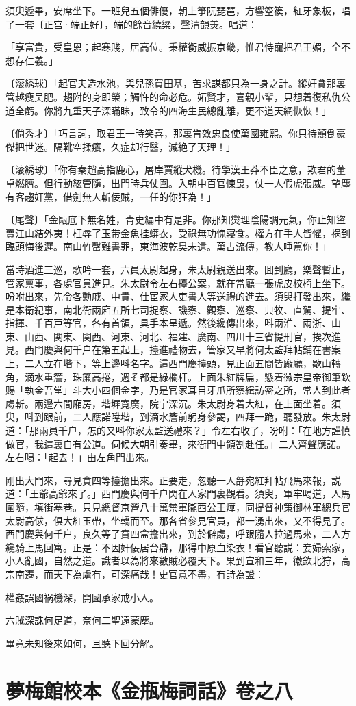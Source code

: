 須臾遞畢，安席坐下。一班兒五個俳優，朝上箏阮琵琶，方響箜篌，紅牙象板，唱了一套〔正宫·端正好〕，端的餘音繞梁，聲清韻羙。唱道：

\begin{myquote}
「享富貴，受皇恩；起寒賤，居高位。秉權衡威振京畿，惟君恃寵把君王媚，全不想存仁義。」

{\markfont〔滚綉球〕}「起官夫造水池，與兒孫買田基，苦求謀都只為一身之計。縱奸貪那裏管越瘦吴肥。趨附的身即榮；觸忤的命必危。妬賢才，喜親小輩，只想着復私仇公道全虧。你將九重天子深瞞眛，致令的四海生民總亂離，更不道天網恢恢！」

{\markfont〔倘秀才〕}「巧言詞，取君王一時笑喜，那裏肯效忠良使萬國雍熙。你只待顛倒豪傑把世迷。隔靴空揉癢，久症却行醫，滅絶了天理！」

{\markfont〔滚綉球〕}「你有秦趙高指鹿心，屠岸賈縱犬機。待學漢王莽不臣之意，欺君的董卓燃臍。但行動絃管隨，出門時兵仗圍。入朝中百官悚畏，仗一人假虎張威。望塵有客趨奸黨，借劍無人斬佞賊，一任的你狂為！」

{\markfont〔尾聲〕}「金甌底下無名姓，青史編中有是非。你那知爕理陰陽調元氣，你止知盜賣江山結外夷！枉辱了玉带金魚挂蟒衣，受祿無功愧寢食。權方在手人皆懼，祸到臨頭悔後遲。南山竹罄難書罪，東海波乾臭未遺。萬古流傳，教人唾駡你！」
\end{myquote}

當時酒進三巡，歌吟一套，六員太尉起身，朱太尉親送出來。囬到廳，樂聲暫止，管家禀事，各處官員進見。朱太尉令左右擡公案，就在當廳一張虎皮校椅上坐下。吩咐出來，先令各勳戚、中貴、仕宦家人吏書人等送禮的進去。須臾打發出來，纔是本衛紀事，南北衙兩廂五所七司捉察、譏察、觀察、巡察、典牧、直駕、提牢、指揮、千百戸等官，各有首領，具手本呈遞。然後纔傳出來，呌兩淮、兩浙、山東、山西、関東、関西、河東、河北、福建、廣南、四川十三省提刑官，挨次進見。西門慶與何千户在第五起上，擡進禮物去，管家又早將何太監拜帖鋪在書案上，二人立在堦下，等上邊呌名字。這西門慶擡頭，見正面五間皆廠廳，歇山轉角，滴水重簷，珠簾高捲，週そ都是綠欄杆。上面朱紅牌扁，懸着徽宗皇帝御筆欽賜「執金吾堂」斗大小四個金字，乃是官家耳目牙爪所察緝訪密之所，常人到此者䖏斬。兩邊六間廂房，堦墀寬廣，院宇深沉。朱太尉身着大紅，在上面坐着。須臾，呌到跟前，二人應諾陞堦，到滴水簷前躬身參謁，四拜一跪，聽發放。朱太尉道：「那兩員千户，怎的又呌你家太監送禮來？」令左右收了，吩咐：「在地方謹慎做官，我這裏自有公道。伺候大朝引奏畢，來衙門中領劄赴任。」二人齊聲應諾。左右喝：「起去！」由左角門出來。

剛出大門來，尋見賁四等擡擔出來。正要走，忽聽一人㧱宛紅拜帖飛馬來報，説道：「王爺高爺來了。」西門慶與何千户閃在人家門裏觀看。須臾，軍牢喝道，人馬圍隨，填街塞巷。只見總督京營八十萬禁軍隴西公王燁，同提督神策御林軍總兵官太尉高俅，俱大紅玉帶，坐轎而至。那各省參見官員，都一湧出來，又不得見了。西門慶與何千户，良久等了賁四盒擔出來，到於僻䖏，呼跟隨人拉過馬來，二人方纔騎上馬回寓。正是：不因奸佞居台鼎，那得中原血染衣！看官聽説：妾婦索家，小人亂國，自然之道。識者以為將來數賊必覆天下。果到宣和三年，徽欽北狩，高宗南遷，而天下為虜有，可深痛哉！史官意不盡，有詩為證：

\begin{myquote}
權姦誤國祸機深，開國承家戒小人。

六賊深誅何足道，奈何二聖遠蒙塵。
\end{myquote}

畢竟未知後來如何，且聽下回分解。

\part*{夢梅館校本《金瓶梅詞話》卷之八}

